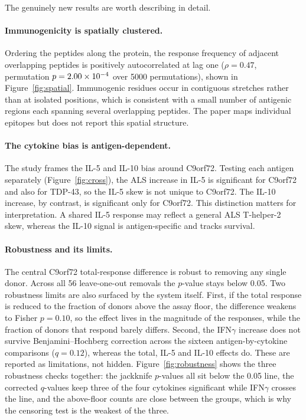 \documentclass[11pt]{article}
\begin{document}
\begin{table}[t]
\centering
\caption{Independent verification of the novel observations: whether a from-scratch recompute matched
the committed result, and the adversarial critic's flags.}
\label{tab:verification}
\footnotesize

\end{table}

The genuinely new results are worth describing in detail.

\paragraph{Immunogenicity is spatially clustered.}
Ordering the peptides along the protein, the response frequency of adjacent overlapping peptides is
positively autocorrelated at lag one ($\rho=0.47$, permutation $p=\num{2.00e-04}{}$ over 5000
permutations), shown in Figure~\ref{fig:spatial}. Immunogenic residues occur in contiguous stretches
rather than at isolated positions, which is consistent with a small number of antigenic regions
each spanning several overlapping peptides. The paper maps individual epitopes but does not report
this spatial structure.

\paragraph{The cytokine bias is antigen-dependent.}
The study frames the IL-5 and IL-10 bias around C9orf72. Testing each antigen separately
(Figure~\ref{fig:cross}), the ALS increase in IL-5 is significant for C9orf72 and also for TDP-43,
so the IL-5 skew is not unique to C9orf72. The IL-10 increase, by contrast, is significant only for
C9orf72. This distinction matters for interpretation. A shared IL-5 response may reflect a general
ALS T-helper-2 skew, whereas the IL-10 signal is antigen-specific and tracks
survival.

\paragraph{Robustness and its limits.}
The central C9orf72 total-response difference is robust to removing any single donor. Across all
56 leave-one-out removals the $p$-value stays below 0.05. Two robustness limits are also surfaced
by the system itself. First, if the total response is reduced to the fraction of donors above the
assay floor, the difference weakens to Fisher $p=0.10$, so the effect lives in the magnitude
of the responses, while the fraction of donors that respond barely differs. Second, the IFN$\gamma$ increase does
not survive Benjamini--Hochberg correction across the sixteen antigen-by-cytokine comparisons
($q=0.12$), whereas the total, IL-5 and IL-10 effects do. These are reported as limitations, not
hidden. Figure~\ref{fig:robustness} shows the three robustness checks together: the jackknife
$p$-values all sit below the 0.05 line, the corrected $q$-values keep three of the four cytokines
significant while IFN$\gamma$ crosses the line, and the above-floor counts are close between the
groups, which is why the censoring test is the weakest of the three.
\end{document}
